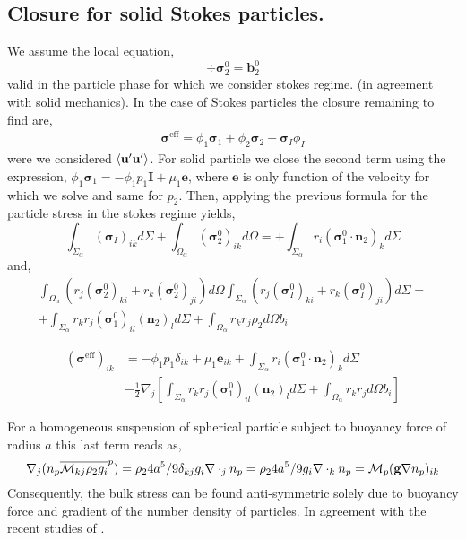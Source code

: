 \subsection{Closure for solid Stokes particles. }
We assume the local equation, 
\begin{equation*}
    \div \bm{\sigma}^0_2 = \textbf{b}_2^0
\end{equation*}
valid in the particle phase for which we consider stokes regime. (in agreement with solid mechanics).
In the case of Stokes particles the closure remaining to find are, 
\begin{align*}
    \bm{\sigma}^\text{eff}
    = \phi_1 \bm{\sigma}_1 + \phi_2 \bm{\sigma}_2  + \bm{\sigma}_I \phi_I 
\end{align*}
were we considered $\left<\textbf{u}'\textbf{u}'\right>$. 
For solid particle we close the second term using the expression, $\phi_1 \bm{\sigma}_1 = - \phi_1 p_1 \textbf{I} + \mu_1 \textbf{e}$, where $\textbf{e}$ is only function of the velocity for which we solve and same for $p_2$. 
Then, applying the previous formula for the particle stress in the stokes regime yields, 
\begin{equation}
    \int_{\Sigma_\alpha} 
    (\bm{\sigma}_I)_{ik}
    d\Sigma
    +\int_{\Omega_\alpha} 
    (\bm{\sigma}_2^0)_{ik}
    d\Omega
    = 
    +\int_{\Sigma_\alpha} 
     r_i (\bm{\sigma}_1^0 \cdot \textbf{n}_2)_{k}
    d\Sigma
\end{equation}
and, 
\begin{multline*}
    \int_{\Omega_\alpha} (r_{j}(\bm{\sigma}^0_2)_{ki}+r_{k}(\bm{\sigma}^0_2)_{ji})d\Omega
    \int_{\Sigma_\alpha} (r_{j}(\bm{\sigma}^0_I)_{ki}+r_{k}(\bm{\sigma}_I^0)_{ji})d\Sigma
    = \\
    +\int_{\Sigma_\alpha}  r_{k}r_{j} (\bm{\sigma}_1^0)_{il} (\textbf{n}_2)_l d\Sigma
    + \int_{\Omega_\alpha} r_{k}r_{j}  \rho_2 d\Omega b_i
\end{multline*}

\begin{align*}
    (\bm{\sigma}^\text{eff})_{ik}
    &=- \phi_1 p_1 \delta_{ik} + \mu_1 \textbf{e}_{ik}
    +\int_{\Sigma_\alpha} 
     r_i (\bm{\sigma}_1^0 \cdot \textbf{n}_2)_{k}
    d\Sigma\\
    &- \frac{1}{2}\nabla_j \left[
        \int_{\Sigma_\alpha}  r_{k}r_{j} (\bm{\sigma}_1^0)_{il} (\textbf{n}_2)_l d\Sigma
        + \int_{\Omega_\alpha} r_{k}r_{j}   d\Omega b_i
    \right]
\end{align*}


For a homogeneous suspension of spherical particle subject to buoyancy force of radius $a$ this last term reads as,
\begin{equation*}
    \mathbf{\nabla}_j (n_p\overline{\mathcal{M}_{kj}  \rho_2  g_i}^{p})
    = \rho_2 4 a^5/9 \delta_{kj} g_i \mathbf{\nabla}\cdot_j n_p
    = \rho_2 4 a^5/9 g_i \mathbf{\nabla}\cdot_k n_p
    = \mathcal{M}_p  (\textbf{g} \nabla n_p)_{ik}
\end{equation*}
Consequently, the bulk stress can be found anti-symmetric solely due to buoyancy force and gradient of the number density of particles. 
In agreement with the recent studies of \citet{wolgemuth2023continuum}.

